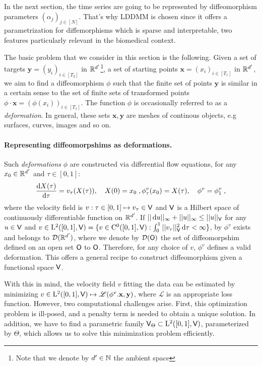   In the next section, the time series are going to be represented by diffeomorphism parameters $(\alpha_j)_{j\in[N]}$.
  That's why LDDMM is chosen since it offers a parametrization for diffemorphisms which is sparse and interpretable, two features particularly relevant in the biomedical context.
 

The basic problem that we consider in this section is the following. Given a set of targets $\mathbf{y}=(y_i)_{i\in[T_2]}$ in $\mathbb{R}^{d'}$\footnote{Note that we denote by $d'\in\mathbb{N}$ the ambient space}, a set of starting points $\mathbf{x}=(x_{i})_{i\in[T_1]}$ in $\mathbb{R}^{d'}$, we aim to find a diffeomorphism $\phi$ such that the finite set of points $\mathbf{y}$ is similar in a certain sense to the set of finite sets of transformed points $\phi \cdot \mathbf{x} =(\phi(x_i))_{i\in[T_1]} $.
 The function $\phi$ is occasionally referred to as a \textit{deformation}. In general, these sets $\mathbf{x},\mathbf{y}$ are meshes of continous objects, e.g surfaces, curves, images and so on.

 
\paragraph{Representing diffeomorpshims as deformations.}
Such \textit{deformations} $\phi$ are constructed via differential flow equations, for any $x_0\in \mathbb{R}^{d'} $ and $\tau\in[0,1]$:
\begin{equation}
  \label{eq:LDDMM_dynamic}
    \frac{\mathop{}\!\mathrm{d} X(\tau)}{\mathop{}\!\mathrm{d} \tau}= v_\tau(X(\tau)), \quad X(0)=x_0\; ,
    \phi^v_\tau(x_0)=X(\tau), \quad \phi^v=\phi^v_1  \; ,
\end{equation}
where the velocity field is $v:\tau\in [0,1]\mapsto v_\tau\in \mathsf{V} $
and $\mathsf{V}$ is a Hilbert space of continuously differentiable function
on $\mathbb{R}^{d'}$.  If
$||\mathop{}\!\mathrm{d} u ||_{\infty}+|| u ||_{\infty}\leq ||u ||_{\mathsf{V}} $ for any
$u\in \mathsf{V}$ and
$v\in \mathrm{L}^2([0,1],\mathsf{V})=\{v\in \mathrm{C}^0([0,1],\mathsf{V}): \int_0^1 ||
v_\tau||^2_{\mathsf{V}} \mathop{}\!\mathrm{d} \tau<\infty \} $, by \citep[Theorem 5]{glaunes2005transport}
$\phi^v$ exists and belongs to $\mathcal{D}(\mathbb{R}^{d'})$, where we denote by $\mathcal{D}(\mathsf{O}) $ the set of diffeomorpshim defined on an open set $\mathsf{O}$ to $\mathsf{O}$.
 Therefore, for any choice of $v$, $\phi^v$ defines a valid deformation. 
This offers a general recipe to construct diffeomorphism given a functional space $\mathsf{V}$.

With this in mind, the velocity field $v$ fitting the data can be
estimated by minimizing 
$v \in \mathrm{L}^2([0,1],\mathsf{V}) \mapsto \mathscr{L}(\phi^{v}.\mathbf{x},\mathbf{y})$, where $\mathscr{L}$ is an appropriate loss function.
 However, two computational challenges arise.
  First, this optimization problem is ill-posed, and a penalty term is needed to obtain a unique solution.
   In addition, we have to find a parametric family $\mathsf{V}_{\Theta} \subset \mathrm{L}^2([0,1],\mathsf{V})$, parameterized by $\Theta$, which allows us to solve this minimization problem efficiently. 

